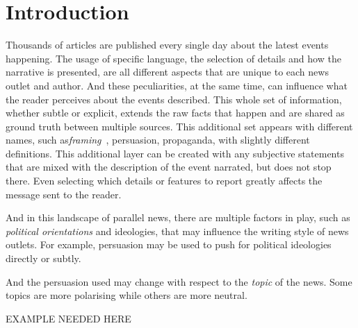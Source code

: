 \chapter{\statusorange Introduction}
\label{chap:intro}


Thousands of articles are published every single day about the latest events happening.
The usage of specific language, the selection of details and how the narrative is presented, are all different aspects that are unique to each news outlet and author.
And these peculiarities, at the same time, can influence what the reader perceives about the events described.
This whole set of information, whether subtle or explicit, extends the raw facts that happen and are shared as ground truth between multiple sources. This additional set appears with different names, such as\emph{framing}~\cite{gamson1989media,scheufele1999framing}, persuasion, propaganda, with slightly different definitions.
This additional layer can be created with any subjective statements that are mixed with the description of the event narrated, but does not stop there.
Even selecting which details or features to report greatly affects the message sent to the reader.

And in this landscape of parallel news, there are multiple factors in play, such as \textit{political orientations} and ideologies, that may influence the writing style of news outlets.
For example, persuasion may be used to push for political ideologies directly or subtly.

And the persuasion used may change with respect to the \emph{topic} of the news. Some topics are more polarising while others are more neutral.

EXAMPLE NEEDED HERE




